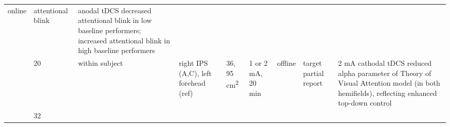 \documentclass[11pt,english,]{memoir}
\begin{document}
\begin{longtable}[]{@{}lllllllll@{}}
\begin{minipage}[t]{0.05\columnwidth}
online\strut
\end{minipage} & \begin{minipage}[t]{0.08\columnwidth}\raggedright
attentional
blink\strut
\end{minipage} & \begin{minipage}[t]{0.27\columnwidth}\raggedright
anodal tDCS decreased attentional blink in low
baseline performers; increased attentional blink
in high baseline performers\strut
\end{minipage}\tabularnewline
\begin{minipage}[t]{0.08\columnwidth}\raggedright
\textcite{Moos2012}\strut
\end{minipage} & \begin{minipage}[t]{0.03\columnwidth}\raggedright
20\strut
\end{minipage} & \begin{minipage}[t]{0.05\columnwidth}\raggedright
within
subject\strut
\end{minipage} & \begin{minipage}[t]{0.12\columnwidth}\raggedright
right IPS (A,C),
left forehead (ref)\strut
\end{minipage} & \begin{minipage}[t]{0.04\columnwidth}\raggedright
36,
95
cm\textsuperscript{2}\strut
\end{minipage} & \begin{minipage}[t]{0.05\columnwidth}\raggedright
1 or 2
mA, 20
min\strut
\end{minipage} & \begin{minipage}[t]{0.05\columnwidth}\raggedright
offline\strut
\end{minipage} & \begin{minipage}[t]{0.08\columnwidth}\raggedright
target
partial
report\strut
\end{minipage} & \begin{minipage}[t]{0.27\columnwidth}\raggedright
2 mA cathodal tDCS reduced alpha parameter of
Theory of Visual Attention model (in both
hemifields), reflecting enhanced top-down control\strut
\end{minipage}\tabularnewline
\begin{minipage}[t]{0.08\columnwidth}\raggedright
\textcite{Roe2016}\strut
\end{minipage} & \begin{minipage}[t]{0.03\columnwidth}\raggedright
32\strut
\end{minipage} & \begin{minipage}[t]{0.05\columnwidth}\raggedright

\end{minipage}
\end{longtable}
\end{document}
